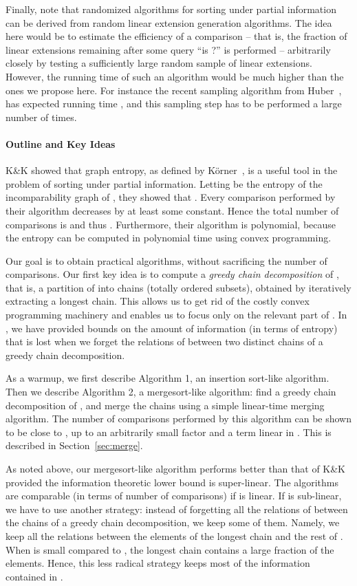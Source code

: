 \documentclass{article} \usepackage{fullpage}
\begin{document}
Finally, note that randomized algorithms for sorting under partial information can be derived from random linear extension generation algorithms. The idea here would be to estimate the efficiency of a comparison -- that is, the fraction of linear extensions remaining after some query ``is ?'' is performed -- arbitrarily closely by testing a sufficiently large random sample of linear extensions. However, the running time of such an algorithm would be much higher than the ones we propose here. For instance the recent sampling algorithm from Huber~\cite{H06}, has expected running time , and this sampling step has to be performed a large number of times.

\paragraph*{Outline and Key Ideas}

K\&K showed that graph entropy, as defined by K\"orner~\cite{K73}, is a useful tool in the problem of sorting under partial information. Letting  be the entropy of the incomparability graph of , they showed that . Every comparison performed by their algorithm decreases  by at least some constant. Hence the total number of comparisons is  and thus . Furthermore, their algorithm is polynomial, because the entropy can be computed in polynomial time using convex programming.

Our goal is to obtain practical algorithms, without sacrificing the number of comparisons. Our first key idea is to compute a {\sl greedy chain decomposition\/} of , that is, a partition of  into chains (totally ordered subsets), obtained by iteratively extracting a longest chain. This allows us to get rid of the costly convex programming machinery and enables us to focus only on the relevant part of . In \cite{POP_SICOMP}, we have provided bounds on the amount of information (in terms of entropy) that is lost when we forget the relations of  between two distinct chains of a greedy chain decomposition.

As a warmup, we first describe Algorithm 1, an insertion sort-like algorithm. Then we describe Algorithm 2, a mergesort-like algorithm: find a greedy chain decomposition of , and merge the chains using a simple linear-time merging algorithm. The number of comparisons performed by this algorithm can be shown to be close to , up to an arbitrarily small factor and a term linear in . This is described in Section~\ref{sec:merge}.

As noted above, our mergesort-like algorithm performs better than that of K\&K provided the information theoretic lower bound  is super-linear. The algorithms are comparable (in terms of number of comparisons) if  is linear. If  is sub-linear, we have to use another strategy: instead of forgetting all the relations of  between the chains of a greedy chain decomposition, we keep some of them. Namely, we keep all the relations between the elements of the longest chain and the rest of . When  is small compared to , the longest chain contains a large fraction of the elements. Hence, this less radical strategy keeps most of the information contained in .
\end{document}
